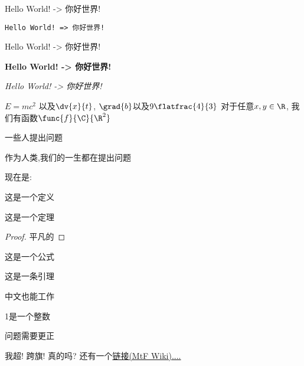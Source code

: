 
Hello World! -> 你好世界!

\texttt{Hello World! => 你好世界!}

\textsf{Hello World! -> 你好世界!}

\textbf{Hello World! -> 你好世界!}

\textit{Hello World! -> 你好世界!}



$E=mc^2$
以及$\dv{x}{t}$, $\grad{b}$以及$9 \flatfrac{4}{3}$ 对于任意$x,y\in \R$, 我们有函数$\func{f}{\C}{\R^2}$

\begin{sporgsmal}[生死]
	一些人提出问题

\end{sporgsmal}
\begin{problem}[问题]
	作为人类,我们的一生都在提出问题
\end{problem}

现在是: \zhtoday \zhcurrtime

\begin{definition}[定义一些东西...]
	这是一个定义
\end{definition}
\begin{theorem}[平凡的定理]
	这是一个定理
	\begin{proof}
		平凡的
	\end{proof}
\end{theorem}
\begin{formula}[你好公式]
	这是一个公式
\end{formula}
\begin{corollary}[你好引理]
	这是一条引理
\end{corollary}
\begin{ch_definition}[中文定义]
	中文也能工作
\end{ch_definition}
\begin{exsample}[整数]
	1是一个整数
\end{exsample}
\begin{ch_corrections}
	问题需要更正
\end{ch_corrections}
我超! 跨旗! \mtfflag 真的吗? 还有一个\href{https://mtf.wiki/zh-cn/}{链接(MtF Wiki)....}

